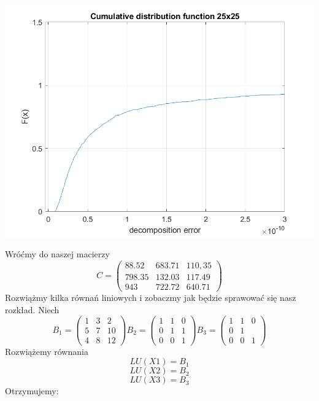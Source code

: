 \documentclass{article}\usepackage{amsmath,amsfonts,amssymb}
\begin{document}
 \begin{center}
   \includegraphics[scale=1]{25x25.png}
\end{center}

Wróćmy do naszej macierzy 
\begin{equation}
C =  
\begin{pmatrix}
  88.52 & 683.71 &  110,35 \\
  798.35 & 132.03 &  117.49 \\
  943 & 722.72 & 640.71 
 \end{pmatrix} 
\end{equation}
Rozwiążmy kilka równań liniowych i zobaczmy jak będzie sprawować się nasz rozkład.
Niech
\begin{equation}
    B_{1} = 
    \begin{pmatrix}
  1 & 3 &  2\\
  5 & 7 &  10 \\
  4 & 8 & 12 
  \end{pmatrix} 
  B_{2} =
  \begin{pmatrix}
  1 & 1 &  0\\
  0 & 1 &  1 \\
  0 & 0 & 1 
  \end{pmatrix}
  B_{3} =
  \begin{pmatrix}
  1 & 1 &  0\\
  0 & 1 &   \\
  0 & 0 & 1 
  \end{pmatrix}
\end{equation}
Rozwiążemy równania 
\[ LU(X1) = B_1 \] 
\[ LU(X2) = B_2 \] 
\[ LU(X3) = B_3 \] 
Otrzymujemy:
\end{document}
